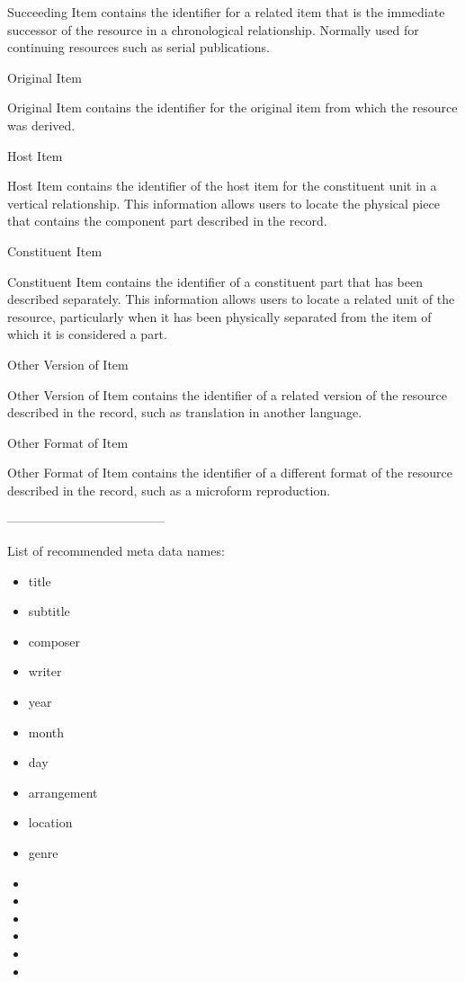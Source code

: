 \documentclass[12pt,a4paper]{scrreprt}
\begin{document}
Succeeding Item contains the identifier for a related item that is the immediate successor of the resource in a chronological relationship. Normally used for continuing resources such as serial publications.

Original Item

Original Item contains the identifier for the original item from which the resource was derived.

Host Item

Host Item contains the identifier of the host item for the constituent unit in a vertical relationship. This information allows users to locate the physical piece that contains the component part described in the record.

Constituent Item

Constituent Item contains the identifier of a constituent part that has been described separately. This information allows users to locate a related unit of the resource, particularly when it has been physically separated from the item of which it is considered a part.

Other Version of Item

Other Version of Item contains the identifier of a related version of the resource described in the record, such as translation in another language.

Other Format of Item

Other Format of Item contains the identifier of a different format of the resource described in the record, such as a microform reproduction.

--------------------------------------

List of recommended meta data names:
\begin{itemize}
\item title
\item subtitle
\item composer
\item writer
\item year
\item month
\item day
\item arrangement
\item location
\item genre
\item 
\item 
\item 
\item 
\item 
\item 
\end{itemize}
\end{document}
